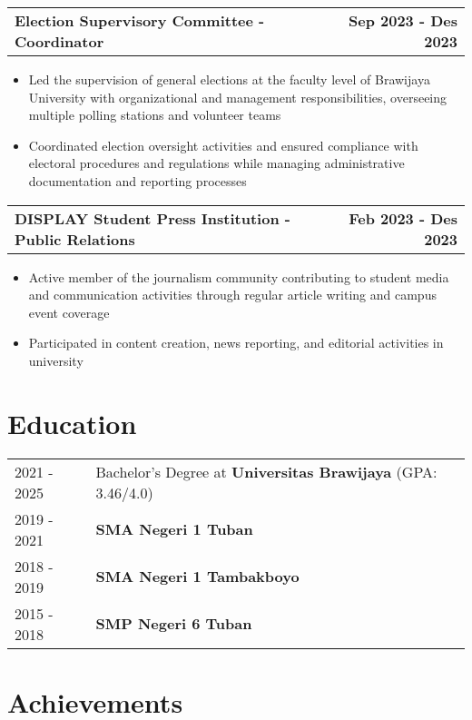 \documentclass[a4paper,12pt]{article}
\makeatletter
\newenvironment{joblong}[2]
    {
    \begin{tabularx}{\linewidth}{@{}l X r@{}}
    \textbf{#1} & \hfill &  #2 \\[3.75pt]
    \end{tabularx}
    \begin{minipage}[t]{\linewidth}
    \begin{itemize}[nosep,after=\strut, leftmargin=1em, itemsep=3pt,label=--]
    }
    {
    \end{itemize}
    \end{minipage}    
    }
\makeatother
\begin{document}
\begin{joblong}{Election Supervisory Committee - Coordinator}{\textbf{Sep 2023 - Des 2023}}
\item Led the supervision of general elections at the faculty level of Brawijaya University with organizational and management responsibilities, overseeing multiple polling stations and volunteer teams
\item Coordinated election oversight activities and ensured compliance with electoral procedures and regulations while managing administrative documentation and reporting processes
\end{joblong}

\begin{joblong}{DISPLAY Student Press Institution - Public Relations}{\textbf{Feb 2023 - Des 2023}}
\item Active member of the journalism community contributing to student media and communication activities through regular article writing and campus event coverage
\item Participated in content creation, news reporting, and editorial activities in university
\end{joblong}


\section{Education}
\begin{tabularx}{\linewidth}{@{}l X@{}}
2021 - 2025 & Bachelor's Degree at \textbf{Universitas Brawijaya} \hfill (GPA: 3.46/4.0) \\ 
2019 - 2021 & \textbf{SMA Negeri 1 Tuban} \\
2018 - 2019 & \textbf{SMA Negeri 1 Tambakboyo} \\
2015 - 2018 & \textbf{SMP Negeri 6 Tuban} \\
\end{tabularx}

\section{Achievements}
\hypersetup{hidelinks}
\end{document}
